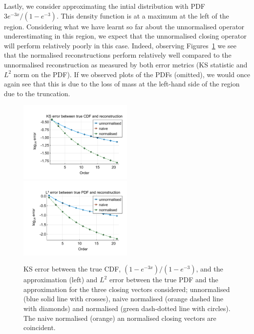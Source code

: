 Lastly, we consider approximating the intial distribution with PDF \(3e^{-3x}/(1-e^{-3})\). This density function is at a maximum at the left of the region. Considering what we have learnt so far about the unnormalised operator underestimating in this region, we expect that the unnormalised closing operator will perform relatively poorly in this case. Indeed, observing Figures~\ref{fig: fun 7 ks error qbdrap closing vecs} we see that the normalised reconstructions perform relatively well compared to the unnormalised reconstruction as measured by both error metrics (KS statistic and \(L^2\) norm on the PDF). If we observed plots of the PDFs (omitted), we would once again see that this is due to the loss of mass at the left-hand side of the region due to the truncation. 
\begin{figure}
	\centering
	\includegraphics[width=0.5\textwidth,trim={1.25cm 0.8cm 0.25cm 1.25cm},clip]{chapter5/figs/qbdrap_closing_vec/fun7/ks_error_formatted.pdf}%
	\includegraphics[width=0.5\textwidth,trim={1.25cm 0.8cm 0.25cm 1.25cm},clip]{chapter5/figs/qbdrap_closing_vec/fun7/l2_pdf_error_formatted.pdf}
	\caption{KS error between the true CDF, \((1-e^{-3x})/(1-e^{-3})\), and the approximation (left) and \(L^2\) error between the true PDF and the approximation for the three closing vectors considered; unnormalised (blue solid line with crosses), naive normalised (orange dashed line with diamonds) and normalised (green dash-dotted line with circles). The naive normalised (orange) an normalised closing vectors are coincident.}
	\label{fig: fun 7 ks error qbdrap closing vecs}
\end{figure}




















